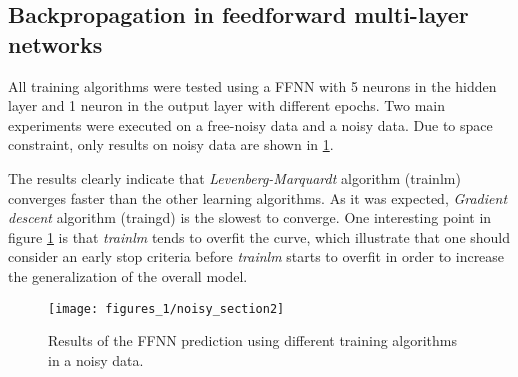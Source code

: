 \subsection{Backpropagation in feedforward multi-layer networks}

All training algorithms were tested using a FFNN with 5 neurons in the hidden layer and 1 neuron in the output layer with different epochs. Two main experiments were executed on a free-noisy data and a noisy data. Due to space constraint, only results on noisy data are shown in \ref{noisy_section2}.

\bigbreak
The results clearly indicate that \textit{Levenberg-Marquardt} algorithm (trainlm) converges faster than the other learning algorithms. As it was expected, \textit{Gradient descent} algorithm (traingd) is the slowest to converge. One interesting point in figure \ref{noisy_section2} is that \textit{trainlm} tends to overfit the curve, which illustrate that one should consider an early stop criteria before \textit{trainlm} starts to overfit in order to increase the generalization of the overall model.

\begin{figure}[!htbp]
\caption{Results of the FFNN prediction using different training algorithms in a noisy data.}
\label{noisy_section2}
\texttt{[image: figures\_1/noisy\_section2]}
\centering
\end{figure}


